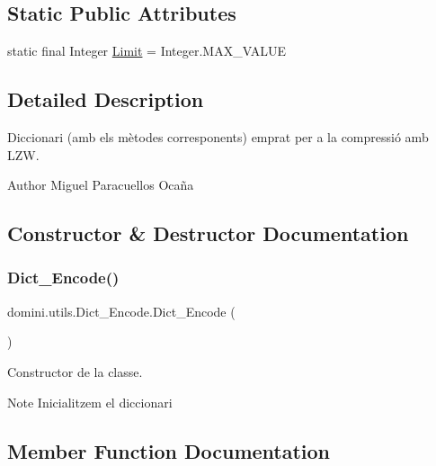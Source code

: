 \subsection*{Static Public Attributes}
\begin{DoxyCompactItemize}
\item 
static final Integer \hyperlink{classdomini_1_1utils_1_1Dict__Encode_a48fe9a878056a119ad36a0aad2727a13}{Limit} = Integer.\+M\+A\+X\+\_\+\+V\+A\+L\+UE
\end{DoxyCompactItemize}


\subsection{Detailed Description}
Diccionari (amb els mètodes corresponents) emprat per a la compressió amb L\+ZW. 

\begin{DoxyAuthor}{Author}
Miguel Paracuellos Ocaña 
\end{DoxyAuthor}


\subsection{Constructor \& Destructor Documentation}
\mbox{\label{classdomini_1_1utils_1_1Dict__Encode_aa16372a031311494fdcae13d1a9b48c3}} 
\subsubsection{\texorpdfstring{Dict\+\_\+\+Encode()}{Dict\_Encode()}}
{\footnotesize\ttfamily domini.\+utils.\+Dict\+\_\+\+Encode.\+Dict\+\_\+\+Encode (\begin{DoxyParamCaption}{ }\end{DoxyParamCaption})\hspace{0.3cm}{\ttfamily [inline]}}



Constructor de la classe. 

\begin{DoxyNote}{Note}
Inicialitzem el diccionari 
\end{DoxyNote}


\subsection{Member Function Documentation}
\mbox{\label{classdomini_1_1utils_1_1Dict__Encode_a12e23ecdd9b0078cb6e56c01126248b9}} 

